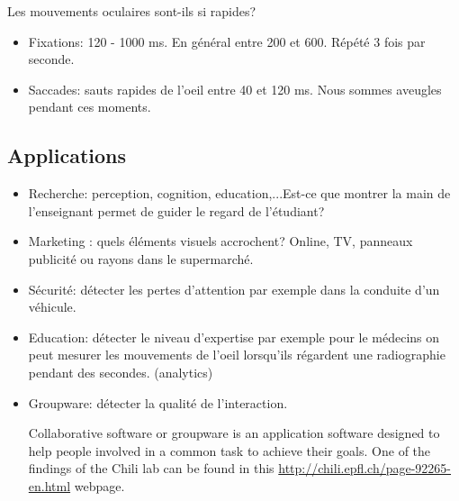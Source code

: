 Les mouvements oculaires sont-ils si rapides?

\begin{itemize}
\item Fixations: 120 - 1000 ms. En g\'en\'eral entre 200 et 600. R\'ep\'et\'e 3 fois par seconde.
\item Saccades: sauts rapides de l'oeil entre 40 et 120 ms. Nous sommes aveugles pendant ces moments.
\end{itemize}

\subsection{Applications}

\begin{itemize}
\item Recherche: perception, cognition, education,...Est-ce que montrer la main de l'enseignant permet de guider le regard de l'\'etudiant?
\item Marketing : quels éléments visuels accrochent? Online, TV, panneaux publicit\'e ou rayons dans le supermarch\'e.
\item S\'ecurit\'e: d\'etecter les pertes d'attention par exemple dans la conduite d'un v\'ehicule.
\item Education: d\'etecter le niveau d'expertise par exemple pour le m\'edecins on peut mesurer les mouvements de l'oeil lorsqu'ils r\'egardent une radiographie pendant des secondes. (analytics)
\item Groupware: d\'etecter la qualit\'e de l'interaction.

Collaborative software or groupware is an application software designed to help people involved in a common task to achieve their goals. One of the findings of the Chili lab can be found in this \url{http://chili.epfl.ch/page-92265-en.html} webpage. 

\begin{figure}[H]
\centering
{}
\end{figure} 


\end{itemize}
